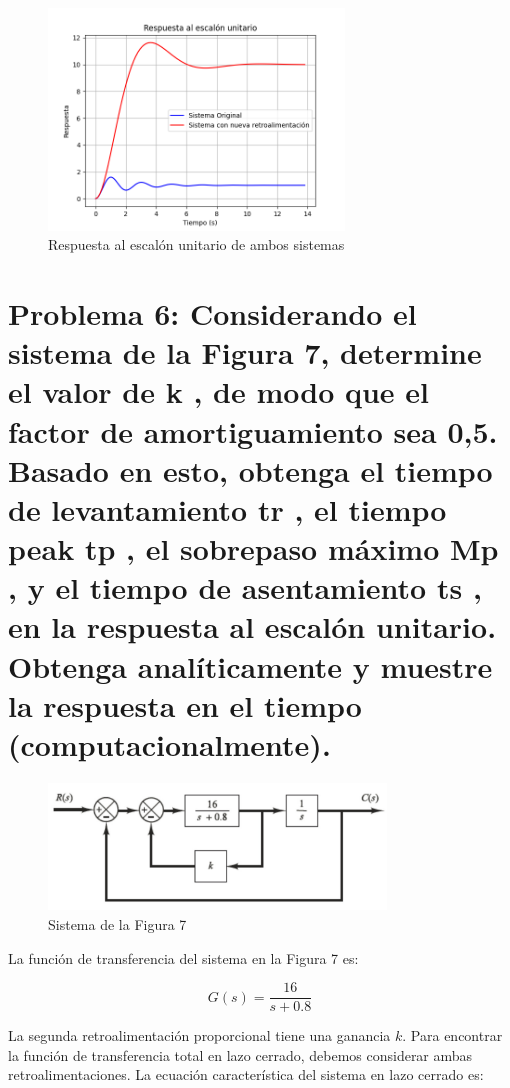 \documentclass[10pt]{article}
\theoremstyle{definition}
\theoremstyle{remark}
\theoremstyle{definition}
\numberwithin{equation}{prob}
\begin{document}
\begin{figure}[h]
	\centering
	\includegraphics[width=0.7\textwidth]{./figures/Figura 6 ejercicio 5.png}
	\caption{Respuesta al escalón unitario de ambos sistemas}
\end{figure}

\newpage

\section{Problema 6: Considerando el sistema de la Figura 7, determine el valor de k , de modo que el factor de
  amortiguamiento sea 0,5. Basado en esto, obtenga el tiempo de levantamiento tr , el tiempo
  peak tp , el sobrepaso máximo Mp , y el tiempo de asentamiento ts , en la respuesta al escalón
  unitario. Obtenga analíticamente y muestre la respuesta en el tiempo (computacionalmente).}

\begin{figure}[h]
	\centering
	\includegraphics[width=0.8\textwidth]{./figures/Figura 7 ejercicio 6.png}
	\caption{Sistema de la Figura 7}
\end{figure}


La función de transferencia del sistema en la Figura 7 es:

\[
	G(s) = \frac{16}{s + 0.8}
\]

La segunda retroalimentación proporcional tiene una ganancia \(k\). Para encontrar la función de transferencia total en lazo cerrado, debemos considerar ambas retroalimentaciones. La ecuación característica del sistema en lazo cerrado es:
\end{document}
